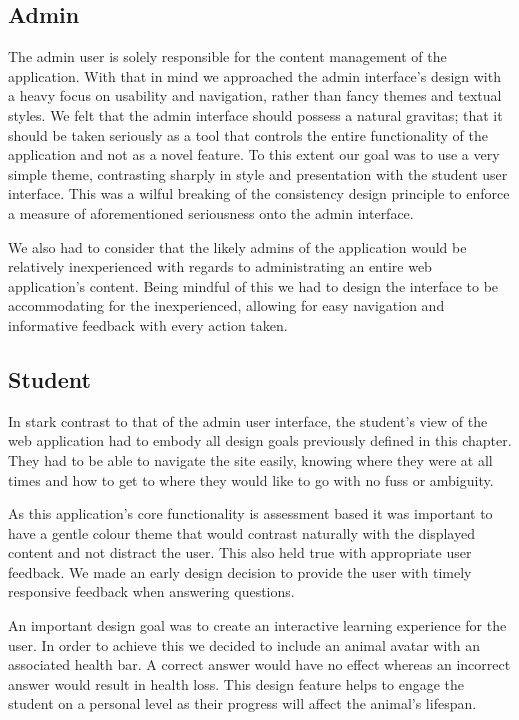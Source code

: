\documentclass{l3proj}
\begin{document}
\subsection{Admin}

The admin user is solely responsible for the content management of the application. With that in mind we approached the admin interface's design with a heavy focus on usability and navigation, rather than fancy themes and textual styles. We felt that the admin interface should possess a natural gravitas; that it should be taken seriously as a tool that controls the entire functionality of the application and not as a novel feature. To this extent our goal was to use a very simple theme, contrasting sharply in style and presentation with the student user interface. This was a wilful breaking of the consistency design principle to enforce a measure of aforementioned seriousness onto the admin interface.

We also had to consider that the likely admins of the application would be relatively inexperienced with regards to administrating an entire web application's content. Being mindful of this we had to design the interface to be accommodating for the inexperienced, allowing for easy navigation and informative feedback with every action taken.

\subsection{Student}

In stark contrast to that of the admin user interface, the student's view of the web application had to embody all design goals previously defined in this chapter. They had to be able to navigate the site easily, knowing where they were at all times and how to get to where they would like to go with no fuss or ambiguity.

As this application's core functionality is assessment based it was important to have a gentle colour theme that would contrast naturally with the displayed content and not distract the user. This also held true with appropriate user feedback. We made an early design decision to provide the user with timely responsive feedback when answering questions.

An important design goal was to create an interactive learning experience for the user. In order to achieve this we decided to include an animal avatar with an associated health bar. A correct answer would have no effect whereas an incorrect answer would result in health loss. This design feature helps to engage the student on a personal level as their progress will affect the animal's lifespan. 
\end{document}
